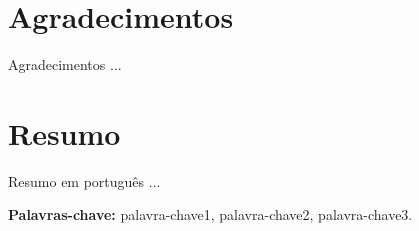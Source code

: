 \documentclass[11pt,twoside,a4paper]{book}
\begin{document}




    
      


\chapter*{Agradecimentos}
Agradecimentos ...

\chapter*{Resumo}
Resumo em português ...

\noindent \textbf{Palavras-chave:} palavra-chave1, palavra-chave2, palavra-chave3.
\end{document}
